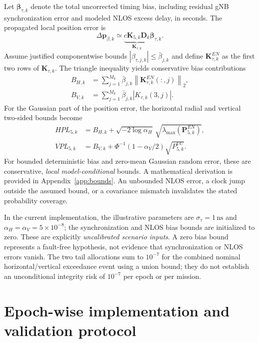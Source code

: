 \documentclass[pdflatex,sn-mathphys-num]{sn-jnl}
\newcommand{\vect}[1]{\boldsymbol{#1}}
\newcommand{\mat}[1]{\mathbf{#1}}
\newcommand{\norm}[1]{\left\lVert #1\right\rVert}
\begin{document}
Let $\vect{\beta}_{\tau,k}$ denote the total uncorrected timing bias,
including residual gNB synchronization error and modeled NLOS excess
delay, in seconds. The propagated local position error is
\begin{equation}\label{eq:Ktoa}
 \Delta\vect{p}_{\beta,k}\simeq
 \underbrace{c\mat{K}_{5,k}\mat{D}_k}_{\mat{K}_{\tau,k}}
 \vect{\beta}_{\tau,k}.
\end{equation}
Assume justified componentwise bounds
$|\beta_{\tau,j,k}|\leq \bar\beta_{j,k}$ and define
$\mat{K}_{\tau,k}^{EN}$ as the first two rows of $\mat{K}_{\tau,k}$.
The triangle inequality yields conservative bias contributions
\begin{align}
 B_{H,k}&=\sum_{j=1}^{M_k}\bar\beta_{j,k}
 \norm{\mat{K}_{\tau,k}^{EN}(:,j)}_2,\label{eq:BH5g}\\
 B_{V,k}&=\sum_{j=1}^{M_k}\bar\beta_{j,k}
 |K_{\tau,k}(3,j)|.\label{eq:BV5g}
\end{align}
For the Gaussian part of the position error, the horizontal radial
and vertical two-sided bounds become
\begin{align}
 HPL_{5,k}&=B_{H,k}+
 \sqrt{-2\log\alpha_H}\,
 \sqrt{\lambda_{\max}(\mat{P}_{5,k}^{EN})},
 \label{eq:HPL5g}\\
 VPL_{5,k}&=B_{V,k}+
 \Phi^{-1}(1-\alpha_V/2)\sqrt{P_{5,k}^{UU}}.
 \label{eq:VPL5g}
\end{align}
For bounded deterministic bias and zero-mean Gaussian random error,
these are conservative, \emph{local model-conditional} bounds.
A mathematical derivation is provided in Appendix~\ref{app:bounds}.
An unbounded NLOS error, a clock jump outside the assumed bound, or a
covariance mismatch invalidates the stated probability coverage.

In the current implementation, the illustrative parameters are
$\sigma_\tau=1\,\mathrm{ns}$ and
$\alpha_H=\alpha_V=5\times10^{-8}$; the synchronization and
NLOS bias bounds are initialized to zero. These are explicitly
\emph{uncalibrated scenario inputs}. A zero bias bound represents a
fault-free hypothesis, not evidence that synchronization or NLOS
errors vanish. The two tail allocations sum to $10^{-7}$ for the
combined nominal horizontal/vertical exceedance event using a union
bound; they do not establish an unconditional integrity risk of
$10^{-7}$ per epoch or per mission.

\section{Epoch-wise implementation and validation protocol}\label{sec:method}
\end{document}
